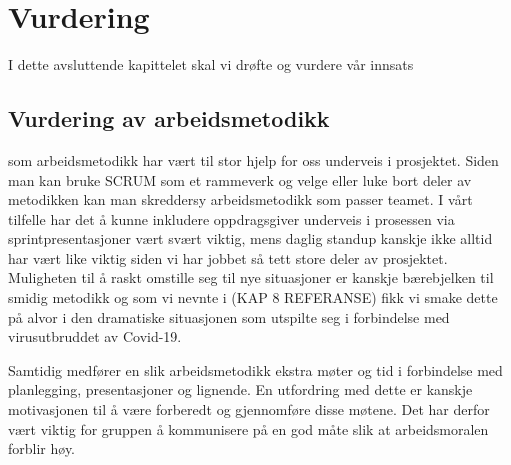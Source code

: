 \chapter{Vurdering}
I dette avsluttende kapittelet skal vi drøfte og vurdere vår innsats

\section{\textbf{Vurdering av arbeidsmetodikk}}
 som arbeidsmetodikk har vært til stor hjelp for oss underveis i prosjektet. Siden man kan bruke SCRUM som et rammeverk og velge eller luke bort deler av metodikken kan man skreddersy arbeidsmetodikk som passer teamet. I vårt tilfelle har det å kunne inkludere oppdragsgiver underveis i prosessen via sprintpresentasjoner vært svært viktig, mens daglig standup kanskje ikke alltid har vært like viktig siden vi har jobbet så tett store deler av prosjektet. Muligheten til å raskt omstille seg til nye situasjoner er kanskje bærebjelken til smidig metodikk og som vi nevnte i (KAP 8 REFERANSE) fikk vi smake dette på alvor i den dramatiske situasjonen som utspilte seg i forbindelse med virusutbruddet av Covid-19. 

Samtidig medfører en slik arbeidsmetodikk ekstra møter og tid i forbindelse med planlegging, presentasjoner og lignende. En utfordring med dette er kanskje motivasjonen til å være forberedt og gjennomføre disse møtene. Det har derfor vært viktig for gruppen å kommunisere på en god måte slik at arbeidsmoralen forblir høy. 


